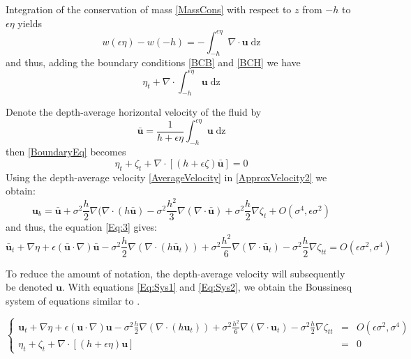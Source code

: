 \documentclass[11pt,a4paper]{article}
\begin{document}
	Integration of the conservation of mass \eqref{MassCons} with respect to $z$ from $-h$ to $\epsilon\eta$ yields
	\begin{equation}
		w(\epsilon\eta) - w(-h) = - \int^{\epsilon\eta}_{-h} \! \nabla \cdot \mathbf{u} \; \mathrm{dz}
	\end{equation}
	and thus, adding the boundary conditions \eqref{BCB} and \eqref{BCH} we have
	\begin{equation}
		\eta_t + \nabla \cdot \int^{\epsilon\eta}_{-h}\ \mathbf{u} \; \mathrm{dz} 
		\label{BoundaryEq}
	\end{equation}
			
	Denote the depth-average horizontal velocity of the fluid by 
	\begin{equation}
		\bar{\mathbf{u}} = \frac{1}{h+\epsilon \eta} \int^{\epsilon\eta}_{-h}\! \mathbf{u} \; \mathrm{dz}
		\label{AverageVelocity}
	\end{equation}
	then \eqref{BoundaryEq} becomes 
	\begin{equation}
		\eta_t + \zeta_t + \nabla \cdot [(h + \epsilon \zeta) \bar{\mathbf{u}}] = 0 
		\label{Eq:Sys2}
	\end{equation}
	Using the depth-average velocity \eqref{AverageVelocity} in \eqref{ApproxVelocity2} we obtain: 
	\begin{equation}
		\mathbf{u}_b = \bar{\mathbf{u}} + \sigma^2\frac{h}{2} \nabla (\nabla \cdot (h \bar{\mathbf{u}}) - \sigma^2 \frac{h^2}{3} \nabla (\nabla \cdot \bar{\mathbf{u}}) + \sigma^2 \frac{h}{2} \nabla \zeta_t + O(\sigma^4, \epsilon \sigma^2)
		\label{AverageVelocity2}
	\end{equation}
	and thus, the equation \eqref{Eq:3} gives: 
	\begin{equation}
		\bar{\mathbf{u}}_t + \nabla \eta + \epsilon(\bar{\mathbf{u}} \cdot \nabla) \bar{\mathbf{u}} - \sigma^2 \frac{h}{2} \nabla ( \nabla \cdot (h\bar{\mathbf{u}}_t)) + \sigma^2 \frac{h^2}{6}\nabla ( \nabla \cdot \bar{\mathbf{u}}_t) - \sigma^2\frac{h}{2}\nabla \zeta_{tt} = O(\epsilon \sigma^2, \sigma^4) 
		\label{Eq:Sys1}
	\end{equation}
			
	To reduce the amount of notation, the depth-average velocity will subsequently be denoted $\mathbf{u}$. With equations \eqref{Eq:Sys1} and \eqref{Eq:Sys2}, we obtain the Boussinesq system of equations similar to \cite{Peregrine}.
	\begin{center}
		$\left\lbrace
			\begin{array}{rll}
				\displaystyle \mathbf{u}_t + \nabla \eta + \epsilon (\mathbf{u} \cdot \nabla)\mathbf{u} - \sigma^2\frac{h}{2}\nabla (\nabla \cdot (h \mathbf{u}_t)) + \sigma^2 \frac{h^2}{6}\nabla (\nabla \cdot \mathbf{u}_t) - \sigma^2\frac{h}{2}\nabla \zeta_{tt}  & = & \displaystyle O(\epsilon \sigma^2, \sigma^4) \\
				\displaystyle \eta_t+\zeta_t + \nabla \cdot [(h+\epsilon\eta)\mathbf{u}] & = & 0
			\end{array}
		\right.$
	\end{center}
			
\end{document}
